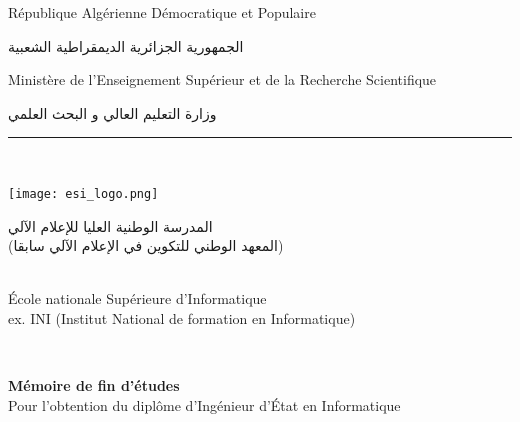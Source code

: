 
\begin{titlepage}
    \centering
    {\small République Algérienne Démocratique et Populaire}\\
    \begin{Arabic}
        الجمهورية الجزائرية الديمقراطية الشعبية \\
    \end{Arabic}
    {\small Ministère de l'Enseignement Supérieur et de la Recherche Scientifique}\\
    \begin{Arabic}
        وزارة التعليم العالي و البحث العلمي \\
    \end{Arabic}
    \rule{\linewidth}{0.3mm} \\[0.4cm]

    \begin{minipage}{5cm}
        \begin{center}
            \texttt{[image: esi\_logo.png]}
        \end{center}
    \end{minipage}\hfill
    \begin{minipage}{10cm}
        \begin{flushright}
            \begin{Arabic}
                المدرسة الوطنية العليا للإعلام الآلي \\
                (المعهد الوطني للتكوين في الإعلام الآلي سابقا)
            \end{Arabic}\\
            {\small École nationale Supérieure d'Informatique}\\[0.1cm]
            {\small ex. INI (Institut National de formation en Informatique)}\\[0.1cm]
        \end{flushright}
    \end{minipage}\hfill\\
    \vspace{20mm}

    {\large \bfseries Mémoire de fin d'études}\\[0.5cm]
    {\large Pour l'obtention du diplôme d'Ingénieur d'État en Informatique}\\[0.5cm]
    {\large \bfseries \documentOption \\ }
    \vspace{10mm}


\end{titlepage}
